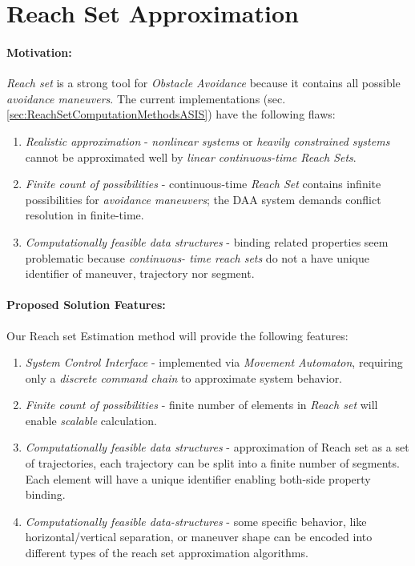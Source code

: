 \cleardoublepage
\section{Reach Set Approximation}\label{s:reachSet}

    \noindent\paragraph{Motivation:} \emph{Reach set} is a strong tool for \emph{Obstacle Avoidance} because it contains all possible \emph{avoidance maneuvers}. The current implementations (sec. \ref{sec:ReachSetComputationMethodsASIS}) have the following flaws:
    
    \begin{enumerate}
        \item \emph{Realistic approximation} - \emph{nonlinear systems} or \emph{heavily constrained systems} cannot be approximated well by \emph{linear continuous-time Reach Sets}.
        
        \item \emph{Finite count of possibilities} - continuous-time \emph{Reach Set} contains  infinite possibilities for \emph{avoidance maneuvers}; the DAA system demands conflict resolution in finite-time.
        
        \item \emph{Computationally feasible data structures} - binding related properties seem problematic because \emph{continuous- time reach sets} do not a have unique identifier of maneuver, trajectory nor segment. 
    \end{enumerate}
    
    \paragraph{Proposed Solution Features:} Our Reach set Estimation method will provide the following features:
    
    \begin{enumerate}
        \item \emph{System Control Interface} - implemented via \emph{Movement Automaton}, requiring only a \emph{discrete command chain} to approximate system behavior.
        
        \item \emph{Finite count of possibilities} - finite number of elements in \emph{Reach set} will enable \emph{scalable} calculation.
        
        \item \emph{Computationally feasible data structures} - approximation of Reach set as a set of trajectories, each trajectory can be split into a finite number of segments. Each element will have a unique identifier enabling both-side  property binding.
        
        \item \emph{Computationally feasible data-structures} - some specific behavior, like horizontal/vertical separation, or maneuver shape can be encoded into  different types of the reach set approximation algorithms.
    \end{enumerate}
